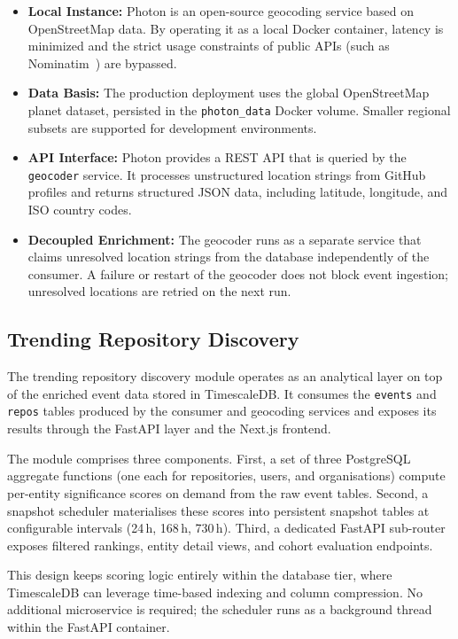 \documentclass[sigconf]{acmart}
\begin{document}
\begin{itemize}
    \item \textbf{Local Instance:} Photon is an open-source geocoding service based on OpenStreetMap data. By operating it as a local Docker container, latency is minimized and the strict usage constraints of public APIs (such as Nominatim~\cite{nominatim}) are bypassed.
    \item \textbf{Data Basis:} The production deployment uses the global OpenStreetMap planet dataset, persisted in the \texttt{photon\_data} Docker volume. Smaller regional subsets are supported for development environments.
    \item \textbf{API Interface:} Photon provides a REST API that is queried by the \texttt{geocoder} service. It processes unstructured location strings from GitHub profiles and returns structured JSON data, including latitude, longitude, and ISO country codes.
    \item \textbf{Decoupled Enrichment:} The geocoder runs as a separate service that claims unresolved location strings from the database independently of the consumer. A failure or restart of the geocoder does not block event ingestion; unresolved locations are retried on the next run.
\end{itemize}
\newpage



\subsection{Trending Repository Discovery}
\label{sec:arch-hg}

The trending repository discovery module operates as an analytical layer on top
of the enriched event data stored in TimescaleDB. It consumes the \texttt{events}
and \texttt{repos} tables produced by the consumer and geocoding services and
exposes its results through the FastAPI layer and the Next.js frontend.

The module comprises three components. First, a set of three PostgreSQL aggregate
functions (one each for repositories, users, and organisations) compute per-entity
significance scores on demand from the raw event tables. Second, a snapshot
scheduler materialises these scores into persistent snapshot tables at configurable
intervals (24\,h, 168\,h, 730\,h). Third, a dedicated FastAPI sub-router exposes
filtered rankings, entity detail views, and cohort evaluation endpoints.

This design keeps scoring logic entirely within the database tier, where
TimescaleDB can leverage time-based indexing and column compression. No additional
microservice is required; the scheduler runs as a background thread within the
FastAPI container.
\end{document}
